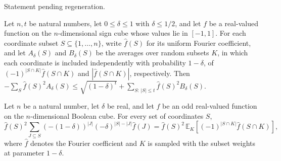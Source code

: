\begin{theorem}
\label{FABL.neg_noiseStability_neg_le_of_odd}
\leanok
{}
Statement pending regeneration.
\end{theorem}

\begin{theorem}
\label{FABL.neg_oxrFourierSum_le_low_add_tail}
\leanok
{}
Let $n,t$ be natural numbers, let $0\le\delta\le1$ with $\delta\le1/2$, and let $f$ be a
real-valued function on the $n$-dimensional sign cube whose values lie in $[-1,1]$. For
each coordinate subset $S\subseteq\{1,\ldots,n\}$, write $\widehat f(S)$ for its uniform
Fourier coefficient, and let $A_\delta(S)$ and $B_\delta(S)$ be the averages over random
subsets $K$, in which each coordinate is included independently with probability
$1-\delta$, of $(-1)^{|S\cap K|}\widehat f(S\cap K)$ and $|\widehat f(S\cap K)|$,
respectively. Then $-\sum_S \widehat f(S)^2 A_\delta(S)\le
\sqrt{(1-\delta)^t}+\sum_{S:\,|S|\le t}\widehat f(S)^2 B_\delta(S)$.
\end{theorem}

\begin{theorem}
\label{FABL.oxrTripleFourierTerm_eq_randomSubsetAverage_of_odd}
\leanok
{}
Let $n$ be a natural number, let $\delta$ be real, and let $f$ be an odd real-valued
function on the $n$-dimensional Boolean cube. For every set of coordinates $S$,
\[
\widehat f(S)^2\sum_{J\subseteq S} (-(1-\delta))^{|J|}(-\delta)^{|S|-|J|}\widehat f(J)
=\widehat f(S)^2\,\mathbb E_K\!\left[(-1)^{|S\cap K|}\widehat f(S\cap K)\right],
\]
where $\widehat f$ denotes the Fourier coefficient and $K$ is sampled with the subset
weights at parameter $1-\delta$.
\end{theorem}

